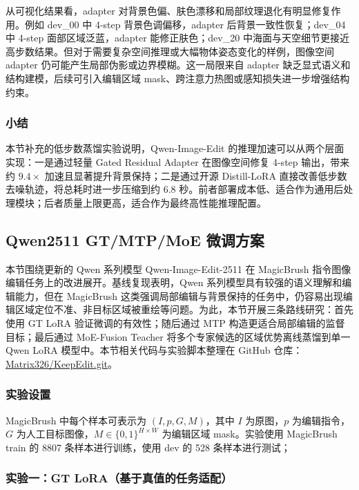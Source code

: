 \documentclass[UTF8,11pt,a4paper,fontset=fandol]{ctexart}
\begin{document}
从可视化结果看，adapter 对背景色偏、肤色漂移和局部纹理退化有明显修复作用。例如 dev\_00 中 4-step 背景色调偏移，adapter 后背景一致性恢复；dev\_04 中 4-step 面部区域泛蓝，adapter 能修正肤色；dev\_20 中海面与天空细节更接近高步数结果。但对于需要复杂空间推理或大幅物体姿态变化的样例，图像空间 adapter 仍可能产生局部伪影或边界模糊。这一局限来自 adapter 缺乏显式语义和结构建模，后续可引入编辑区域 mask、跨注意力热图或感知损失进一步增强结构约束。

\subsubsection{小结}

本节补充的低步数蒸馏实验说明，Qwen-Image-Edit 的推理加速可以从两个层面实现：一是通过轻量 Gated Residual Adapter 在图像空间修复 4-step 输出，带来约 $9.4\times$ 加速且显著提升背景保持；二是通过开源 Distill-LoRA 直接改善低步数去噪轨迹，将总耗时进一步压缩到约 6.8 秒。前者部署成本低、适合作为通用后处理模块；后者质量上限更高，适合作为最终高性能推理配置。


\subsection{Qwen2511 GT/MTP/MoE 微调方案}

本节围绕更新的 Qwen 系列模型 Qwen-Image-Edit-2511 在 MagicBrush 指令图像编辑任务上的改进展开。基线复现表明，Qwen 系列模型具有较强的语义理解和编辑能力，但在 MagicBrush 这类强调局部编辑与背景保持的任务中，仍容易出现编辑区域定位不准、非目标区域被重绘等问题。为此，本节开展三条路线研究：首先使用 GT LoRA 验证微调的有效性；随后通过 MTP 构造更适合局部编辑的监督目标；最后通过 MoE-Fusion Teacher 将多个专家候选的区域优势离线蒸馏到单一 Qwen LoRA 模型中。本节相关代码与实验脚本整理在 GitHub 仓库：\href{https://github.com/Matrix326/KeepEdit.git}{Matrix326/KeepEdit.git}。

\subsubsection{实验设置}

MagicBrush 中每个样本可表示为 $(I,p,G,M)$，其中 $I$ 为原图，$p$ 为编辑指令，$G$ 为人工目标图像，$M\in\{0,1\}^{H\times W}$ 为编辑区域 mask。实验使用 MagicBrush train 的 8807 条样本进行训练，使用 dev 的 528 条样本进行测试；

\subsubsection{实验一：GT LoRA（基于真值的任务适配）}
\end{document}
